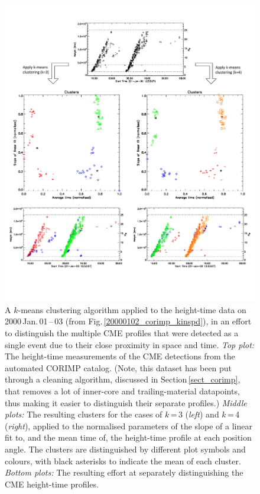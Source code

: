 \documentclass[referee,a4paper,12pt,traditabstract]{swsc}
\begin{document}
\begin{linenumbers}
\begin{figure}[t]
\centerline{\includegraphics[scale=0.578, trim=0 95 0 50, clip=true]{images/20000101_cluster_kins_input.pdf}}
\caption{A $k$-means clustering algorithm applied to the height-time data on 2000\,Jan.\,01\,--\,03 (from Fig.\,\ref{20000102_corimp_kinspd}), in an effort to distinguish the multiple CME profiles that were detected as a single event due to their close proximity in space and time. \emph{Top plot:} The height-time measurements of the CME detections from the automated CORIMP catalog. (Note, this dataset has been put through a cleaning algorithm, discussed in Section\,\ref{sect_corimp}, that removes a lot of inner-core and trailing-material datapoints, thus making it easier to distinguish their separate profiles.) \emph{Middle plots:} The resulting clusters for the cases of $k$\,=\,3 (\emph{left}) and $k$\,=\,4 (\emph{right}), applied to the normalised parameters of the slope of a linear fit to, and the mean time of, the height-time profile at each position angle. The clusters are distinguished by different plot symbols and colours, with black asterisks to indicate the mean of each cluster. \emph{Bottom plots:} The resulting effort at separately distinguishing the CME height-time profiles.
}
\label{20000101_cluster_kins}
\end{figure}


\end{linenumbers}
\end{document}

